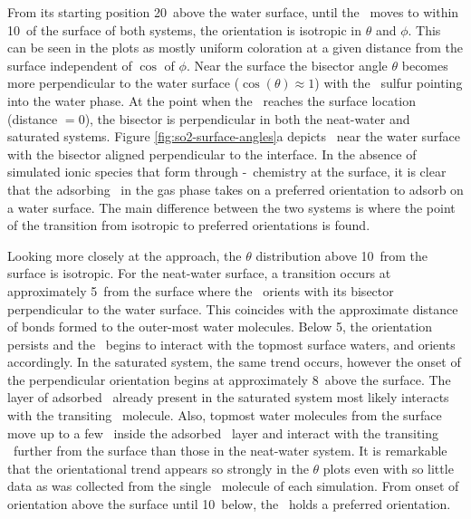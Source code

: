 	From its starting position 20\angs~above the water surface, until the \suldiox~moves to within 10\angs~of the surface of both systems, the orientation is isotropic in $\theta$ and $\phi$. This can be seen in the plots as mostly uniform coloration at a given distance from the surface independent of $\cos$ of $\phi$. Near the surface the bisector angle $\theta$ becomes more perpendicular to the water surface ($\cos(\theta)\approx1$) with the \suldiox~sulfur pointing into the water phase. At the point when the \suldiox~reaches the surface location (distance $=0$\angs), the bisector is perpendicular in both the neat-water and saturated systems. Figure \ref{fig:so2-surface-angles}a depicts \suldiox~near the water surface with the bisector aligned perpendicular to the interface. In the absence of simulated ionic species that form through \suldiox-\wat~chemistry at the surface, it is clear that the adsorbing \suldiox~in the gas phase takes on a preferred orientation to adsorb on a water surface. The main difference between the two systems is where the point of the transition from isotropic to preferred orientations is found. 
 
  Looking more closely at the approach, the $\theta$ distribution above 10\angs~from the surface is isotropic. For the neat-water surface, a transition occurs at approximately 5\angs~from the surface where the \suldiox~orients with its bisector perpendicular to the water surface. This coincides with the approximate distance of bonds formed to the outer-most water molecules. Below 5\angs, the orientation persists and the \suldiox~begins to interact with the topmost surface waters, and orients accordingly. In the saturated system, the same trend occurs, however the onset of the perpendicular orientation begins at approximately 8\angs~above the surface. The layer of adsorbed \suldiox~already present in the saturated system most likely interacts with the transiting \suldiox~molecule. Also, topmost water molecules from the surface move up to a few \angs~inside the adsorbed \suldiox~layer and interact with the transiting \suldiox~further from the surface than those in the neat-water system. It is remarkable that the orientational trend appears so strongly in the $\theta$ plots even with so little data as was collected from the single \suldiox~molecule of each simulation. From onset of orientation above the surface until 10\angs~below, the \suldiox~holds a preferred orientation.


